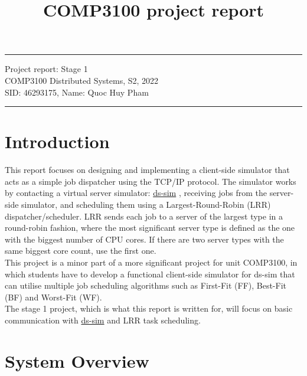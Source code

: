 \documentclass[a4paper]{article} %
\begin{document}

\title{COMP3100 project report} %
\fancyhead[C]{}
\hrule \medskip %
\begin{minipage}{1\textwidth} %
\centering 
\large %
Project report: Stage 1\\ %
COMP3100 Distributed Systems, S2, 2022\\
\normalsize %
SID: 46293175, Name: Quoc Huy Pham
\end{minipage}
\medskip\hrule %
\bigskip

\section{Introduction}

This report focuses on designing and implementing a client-side simulator that acts as a simple job dispatcher using the TCP/IP protocol. The simulator works by contacting a virtual server simulator: \href{https://github.com/distsys-MQ/ds-sim}{ds-sim} \cite{ds-sim}, receiving jobs from the server-side simulator, and scheduling them using a Largest-Round-Robin (LRR) dispatcher/scheduler. LRR sends each job to a server of the largest type in a round-robin fashion, where the most significant server type is defined as the one with the biggest number of CPU cores. If there are two server types with the same biggest core count, use the first one.
\\This project is a minor part of a more significant project for unit COMP3100, in which students have to develop a functional client-side simulator for ds-sim that can utilise multiple job scheduling algorithms such as  First-Fit (FF), Best-Fit (BF) and Worst-Fit (WF).
\\The stage 1 project, which is what this report is written for, will focus on basic communication with \href{https://github.com/distsys-MQ/ds-sim}{ds-sim} \cite{ds-sim} and LRR task scheduling.

\section{System Overview}
\label{sec:section2}
\end{document}
